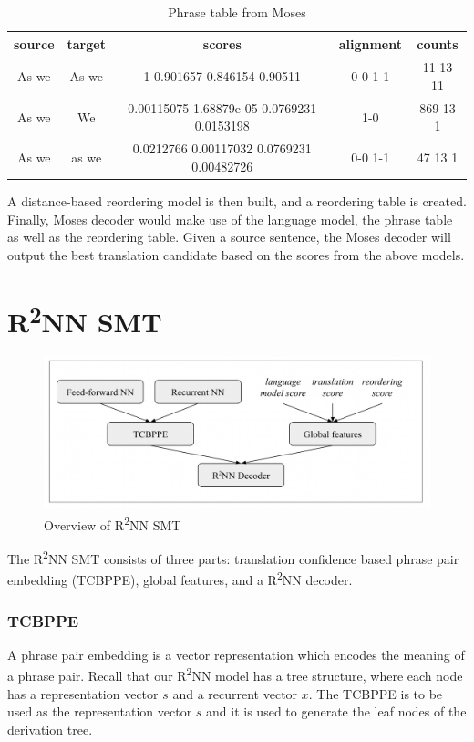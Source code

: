 \documentclass[12pt,a4paper,twoside,openright]{report}
\begin{document}
\begin{table}[h!]
\centering
\begin{tabular}{ |c|c|c|c|c| } 
 \hline
 source & target & scores & alignment & counts \\ [0.5ex] 
 \hline
 As we & As we & 1 0.901657 0.846154 0.90511 & 0-0 1-1 & 11 13 11\\
 As we & We & 0.00115075 1.68879e-05 0.0769231 0.0153198 & 1-0 & 869 13 1\\
 As we & as we & 0.0212766 0.00117032 0.0769231 0.00482726 & 0-0 1-1 & 47 13 1\\
 \hline
\end{tabular}
\caption{Phrase table from Moses}
\label{table:phrase_table}
\end{table}

A distance-based reordering model is then built, and a reordering table is created. Finally, Moses decoder would make use of the language model, the phrase table as well as the reordering table. Given a source sentence, the Moses decoder will output the best translation candidate based on the scores from the above models. 

\section{\texorpdfstring{R\textsuperscript{2}NN}{R2NN} SMT}

\begin{figure}[ht]
\centering
\includegraphics[width=1\textwidth]{images/r2nn_pipeline.png}
\caption{Overview of R\textsuperscript{2}NN SMT}
\label{fig:r2nn_pipeline}
\end{figure}

The R\textsuperscript{2}NN SMT consists of three parts: translation confidence based phrase pair embedding (TCBPPE), global features, and a R\textsuperscript{2}NN decoder.

\subsubsection{TCBPPE}
A phrase pair embedding is a vector representation which encodes the meaning of a phrase pair. Recall that our R\textsuperscript{2}NN model has a tree structure, where each node has a representation vector $s$ and a recurrent vector $x$. The TCBPPE is to be used as the representation vector $s$ and it is used to generate the leaf nodes of the derivation tree. 
\end{document}

